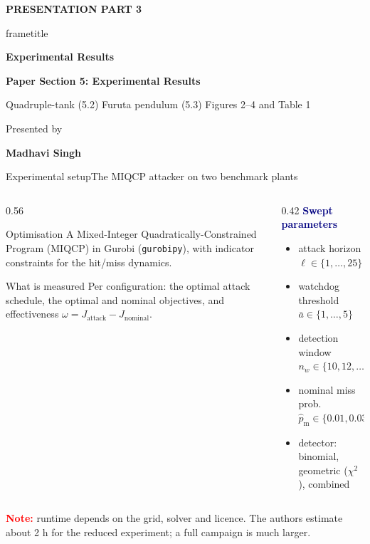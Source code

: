 \documentclass[8pt,aspectratio=169]{beamer}
\gdef\CPSOrigin{PAPER}%
\gdef\CPSSourceContext{}%
\newcommand{\CPSSpeakerTitleContent}[5]{%
  \centering
  {\small\bfseries\color{CPSgreen}PRESENTATION PART #1\par}
  \vspace{1.2em}
  \begin{beamercolorbox}[wd=.94\linewidth,sep=12pt,center,rounded=true,shadow=false]{frametitle}
    {\LARGE\bfseries #2\par}
  \end{beamercolorbox}
  \vspace{1.1em}
  {\normalsize\bfseries\color{CPSgreen!75!black}#3\par}
  \vspace{.5em}
  {\small\color{black!75}#4\par}
  \vspace{1.7em}
  {\scriptsize\color{black!65}Presented by\par}
  \vspace{.3em}
  {\large\bfseries\color{CPSgreen}#5\par}
}
\begin{document}
\begin{frame}[c]
\gdef\CPSSourceContext{}
\gdef\CPSOrigin{PAPER}
\CPSSpeakerTitleContent{3}{Experimental Results}
  {Paper Section 5: Experimental Results}
  {Quadruple-tank (5.2) \textperiodcentered{} Furuta pendulum (5.3) \textperiodcentered{} Figures 2--4 and Table 1}
  {Madhavi Singh}
\end{frame}

\begin{frame}{Experimental setup}{The MIQCP attacker on two benchmark plants}
\gdef\CPSSourceContext{}
\gdef\CPSOrigin{PAPER}
  \begin{columns}[T]
    \begin{column}{0.56\textwidth}
      \begin{block}{Optimisation}
        A Mixed-Integer Quadratically-Constrained Program (MIQCP) in Gurobi (\texttt{gurobipy}), with indicator constraints for the hit/miss dynamics.
      \end{block}
      \begin{block}{What is measured}
        Per configuration: the optimal attack schedule, the optimal and nominal objectives, and effectiveness $\omega = J_{\text{attack}} - J_{\text{nominal}}$.
      \end{block}
    \end{column}
    \begin{column}{0.42\textwidth}
      \textbf{\textcolor{navy}{Swept parameters}}
      \begin{itemize}
        \item attack horizon $\ell \in \{1,\dots,25\}$
        \item watchdog threshold $\bar a \in \{1,\dots,5\}$
        \item detection window $n_w \in \{10,12,\dots,20\}$
        \item nominal miss prob.\ $\hat p_{\mathrm m} \in \{0.01,0.03,\dots,0.25\}$
        \item detector: binomial, geometric ($\chi^2$), combined
      \end{itemize}
    \end{column}
  \end{columns}
  \medskip
  {\footnotesize\textcolor{red}{\textbf{Note:}} runtime depends on the grid, solver and licence. The authors estimate about 2 h for the reduced experiment; a full campaign is much larger.}
\end{frame}
\end{document}
